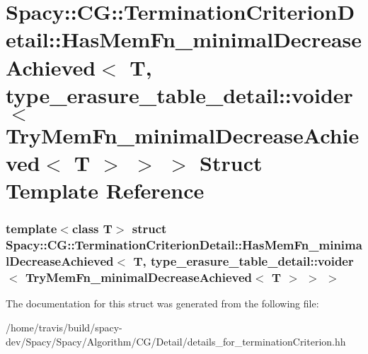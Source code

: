 \hypertarget{structSpacy_1_1CG_1_1TerminationCriterionDetail_1_1HasMemFn__minimalDecreaseAchieved_3_01T_00_01a13b34436253fc8ec0a6c7be544efb58}{\section{\-Spacy\-:\-:\-C\-G\-:\-:\-Termination\-Criterion\-Detail\-:\-:\-Has\-Mem\-Fn\-\_\-minimal\-Decrease\-Achieved$<$ \-T, type\-\_\-erasure\-\_\-table\-\_\-detail\-:\-:voider$<$ \-Try\-Mem\-Fn\-\_\-minimal\-Decrease\-Achieved$<$ \-T $>$ $>$ $>$ \-Struct \-Template \-Reference}
\label{structSpacy_1_1CG_1_1TerminationCriterionDetail_1_1HasMemFn__minimalDecreaseAchieved_3_01T_00_01a13b34436253fc8ec0a6c7be544efb58}
}
\subsubsection*{template$<$class T$>$ struct Spacy\-::\-C\-G\-::\-Termination\-Criterion\-Detail\-::\-Has\-Mem\-Fn\-\_\-minimal\-Decrease\-Achieved$<$ T, type\-\_\-erasure\-\_\-table\-\_\-detail\-::voider$<$ Try\-Mem\-Fn\-\_\-minimal\-Decrease\-Achieved$<$ T $>$ $>$ $>$}



\-The documentation for this struct was generated from the following file\-:\begin{DoxyCompactItemize}
\item 
/home/travis/build/spacy-\/dev/\-Spacy/\-Spacy/\-Algorithm/\-C\-G/\-Detail/details\-\_\-for\-\_\-termination\-Criterion.\-hh\end{DoxyCompactItemize}
